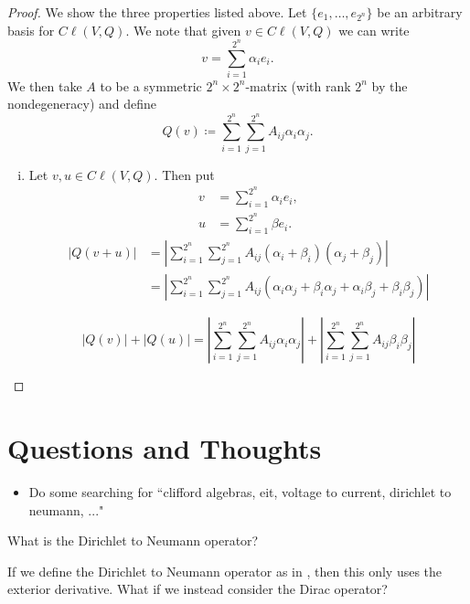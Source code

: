 \begin{proof}
We show the three properties listed above.  Let $\{e_1,\dots,e_{2^n}\}$ be an arbitrary basis for $C\ell(V,Q)$. We note that given $v \in C\ell(V,Q)$ we can write
\[
v=\sum_{i=1}^{2^n} \alpha_i e_i.
\]
We then take $A$ to be a symmetric $2^n\times 2^n$-matrix (with rank $2^n$ by the nondegeneracy) and define
\[
Q(v)\coloneqq \sum_{i=1}^{2^n} \sum_{j=1}^{2^n} A_{ij}\alpha_i \alpha_j.
\]
\begin{enumerate}[(i)]
    \item Let $v,u \in C\ell(V,Q)$.  Then put
    \begin{align*}
        v &= \sum_{i=1}^{2^n} \alpha_i e_i,\\
        u &= \sum_{i=1}^{2^n} \beta e_i.
    \end{align*}
    \begin{align*}
    |Q(v+u)|&=\left|\sum_{i=1}^{2^n} \sum_{j=1}^{2^n} A_{ij}(\alpha_i+\beta_i) (\alpha_j+\beta_j)\right|\\
    &= \left|\sum_{i=1}^{2^n} \sum_{j=1}^{2^n} A_{ij}(\alpha_i \alpha_j +\beta_i \alpha_j+ \alpha_i\beta_j +\beta_i\beta_j)\right|
    \end{align*}
    
    \[
    |Q(v)|+|Q(u)| = \left|\sum_{i=1}^{2^n} \sum_{j=1}^{2^n} A_{ij}\alpha_i \alpha_j\right| + \left|\sum_{i=1}^{2^n} \sum_{j=1}^{2^n} A_{ij}\beta_i \beta_j\right|
    \]
\end{enumerate}
\end{proof}



\section{Questions and Thoughts}

\begin{itemize}
    \item Do some searching for ``clifford algebras, eit, voltage to current, dirichlet to neumann, ..."
\end{itemize}

\begin{question}
What is the Dirichlet to Neumann operator?
\end{question}

\begin{question}
If we define the Dirichlet to Neumann operator as in \cite{clay_d-to-n_map}, then this only uses the exterior derivative. What if we instead consider the Dirac operator?
\end{question}

